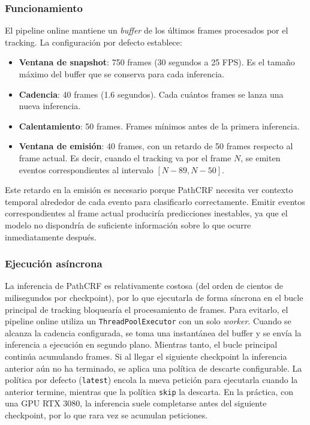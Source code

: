 \subsubsection{Funcionamiento}
El pipeline online mantiene un \textit{buffer} de los últimos frames procesados por el tracking. La configuración por defecto establece:
\begin{itemize}
    \item \textbf{Ventana de snapshot}: 750 frames (30 segundos a 25 FPS). Es el tamaño máximo del buffer que se conserva para cada inferencia.
    \item \textbf{Cadencia}: 40 frames (1.6 segundos). Cada cuántos frames se lanza una nueva inferencia.
    \item \textbf{Calentamiento}: 50 frames. Frames mínimos antes de la primera inferencia.
    \item \textbf{Ventana de emisión}: 40 frames, con un retardo de 50 frames respecto al frame actual. Es decir, cuando el tracking va por el frame $N$, se emiten eventos correspondientes al intervalo $[N-89, N-50]$.
\end{itemize}
Este retardo en la emisión es necesario porque PathCRF necesita ver contexto temporal alrededor de cada evento para clasificarlo correctamente. Emitir eventos correspondientes al frame actual produciría predicciones inestables, ya que el modelo no dispondría de suficiente información sobre lo que ocurre inmediatamente después.
\subsubsection{Ejecución asíncrona}
La inferencia de PathCRF es relativamente costosa (del orden de cientos de milisegundos por checkpoint), por lo que ejecutarla de forma síncrona en el bucle principal de tracking bloquearía el procesamiento de frames. Para evitarlo, el pipeline online utiliza un \texttt{ThreadPoolExecutor} con un solo \textit{worker}. Cuando se alcanza la cadencia configurada, se toma una instantánea del buffer y se envía la inferencia a ejecución en segundo plano. Mientras tanto, el bucle principal continúa acumulando frames.
Si al llegar el siguiente checkpoint la inferencia anterior aún no ha terminado, se aplica una política de descarte configurable. La política por defecto (\texttt{latest}) encola la nueva petición para ejecutarla cuando la anterior termine, mientras que la política \texttt{skip} la descarta. En la práctica, con una GPU RTX 3080, la inferencia suele completarse antes del siguiente checkpoint, por lo que rara vez se acumulan peticiones.
